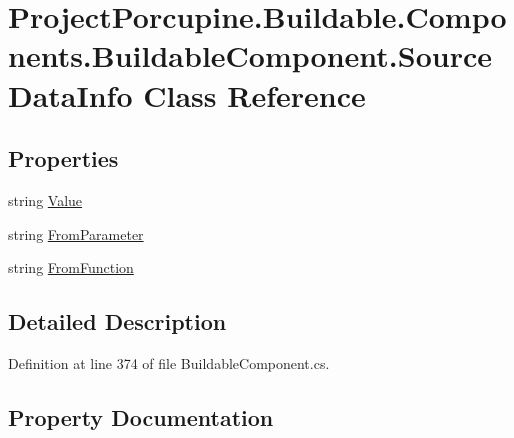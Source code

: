 \hypertarget{class_project_porcupine_1_1_buildable_1_1_components_1_1_buildable_component_1_1_source_data_info}{}\section{Project\+Porcupine.\+Buildable.\+Components.\+Buildable\+Component.\+Source\+Data\+Info Class Reference}
\label{class_project_porcupine_1_1_buildable_1_1_components_1_1_buildable_component_1_1_source_data_info}
\subsection*{Properties}
\begin{DoxyCompactItemize}
\item 
string \hyperlink{class_project_porcupine_1_1_buildable_1_1_components_1_1_buildable_component_1_1_source_data_info_afc68cf3ff3dc3f2390423ef1f00cffff}{Value}
\item 
string \hyperlink{class_project_porcupine_1_1_buildable_1_1_components_1_1_buildable_component_1_1_source_data_info_a1c2794b335863bf55135ddc883acbb60}{From\+Parameter}
\item 
string \hyperlink{class_project_porcupine_1_1_buildable_1_1_components_1_1_buildable_component_1_1_source_data_info_ad5de406e24edfc326cc4c7f602be70b8}{From\+Function}
\end{DoxyCompactItemize}


\subsection{Detailed Description}


Definition at line 374 of file Buildable\+Component.\+cs.



\subsection{Property Documentation}
\mbox{\label{class_project_porcupine_1_1_buildable_1_1_components_1_1_buildable_component_1_1_source_data_info_ad5de406e24edfc326cc4c7f602be70b8}} 
